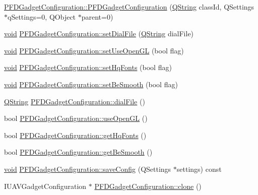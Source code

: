 \begin{DoxyCompactItemize}
\item 
\hyperlink{group___o_p_map_plugin_gacb5ca139ed284444e5e173641b6001bd}{P\-F\-D\-Gadget\-Configuration\-::\-P\-F\-D\-Gadget\-Configuration} (\hyperlink{group___u_a_v_objects_plugin_gab9d252f49c333c94a72f97ce3105a32d}{Q\-String} class\-Id, Q\-Settings $\ast$q\-Settings=0, Q\-Object $\ast$parent=0)
\item 
\hyperlink{group___u_a_v_objects_plugin_ga444cf2ff3f0ecbe028adce838d373f5c}{void} \hyperlink{group___o_p_map_plugin_gae14181eda65a05f6f8ad21aa6a531aaa}{P\-F\-D\-Gadget\-Configuration\-::set\-Dial\-File} (\hyperlink{group___u_a_v_objects_plugin_gab9d252f49c333c94a72f97ce3105a32d}{Q\-String} dial\-File)
\item 
\hyperlink{group___u_a_v_objects_plugin_ga444cf2ff3f0ecbe028adce838d373f5c}{void} \hyperlink{group___o_p_map_plugin_ga8a6a328024b4a742149d9922328a014b}{P\-F\-D\-Gadget\-Configuration\-::set\-Use\-Open\-G\-L} (bool flag)
\item 
\hyperlink{group___u_a_v_objects_plugin_ga444cf2ff3f0ecbe028adce838d373f5c}{void} \hyperlink{group___o_p_map_plugin_gaf36027ad5fc6d02f4433df45538cef4f}{P\-F\-D\-Gadget\-Configuration\-::set\-Hq\-Fonts} (bool flag)
\item 
\hyperlink{group___u_a_v_objects_plugin_ga444cf2ff3f0ecbe028adce838d373f5c}{void} \hyperlink{group___o_p_map_plugin_ga8a3abfa9447e111ebdfdddb6b005be4b}{P\-F\-D\-Gadget\-Configuration\-::set\-Be\-Smooth} (bool flag)
\item 
\hyperlink{group___u_a_v_objects_plugin_gab9d252f49c333c94a72f97ce3105a32d}{Q\-String} \hyperlink{group___o_p_map_plugin_ga0c75d60343b097f8da312d96e5fa8a68}{P\-F\-D\-Gadget\-Configuration\-::dial\-File} ()
\item 
bool \hyperlink{group___o_p_map_plugin_ga9ee42411026741bf10767ec9bddf4f5e}{P\-F\-D\-Gadget\-Configuration\-::use\-Open\-G\-L} ()
\item 
bool \hyperlink{group___o_p_map_plugin_ga618cd55f8f758294cbed557e9e610eb6}{P\-F\-D\-Gadget\-Configuration\-::get\-Hq\-Fonts} ()
\item 
bool \hyperlink{group___o_p_map_plugin_ga50b05c372ea7566767fee660a4e811f3}{P\-F\-D\-Gadget\-Configuration\-::get\-Be\-Smooth} ()
\item 
\hyperlink{group___u_a_v_objects_plugin_ga444cf2ff3f0ecbe028adce838d373f5c}{void} \hyperlink{group___o_p_map_plugin_ga31f17afc274f0b137893d28f61adb4ca}{P\-F\-D\-Gadget\-Configuration\-::save\-Config} (Q\-Settings $\ast$settings) const 
\item 
I\-U\-A\-V\-Gadget\-Configuration $\ast$ \hyperlink{group___o_p_map_plugin_gabe4d60a242c6090fd1df05c1da47e165}{P\-F\-D\-Gadget\-Configuration\-::clone} ()

\end{DoxyCompactItemize}
